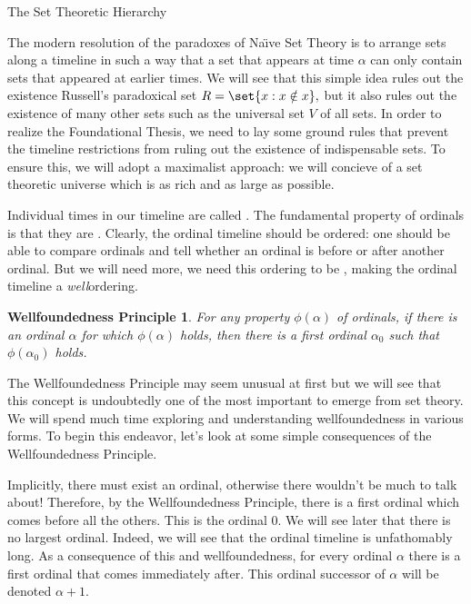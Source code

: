 \begin{unit}{The Set Theoretic Hierarchy}
\theoremstyle{themph}
\newtheorem*{boundedcomprehension}{Bounded Comprehension Principle}
\newtheorem*{hierarchyprinciple}{Hierarchy Principle}
\newtheorem*{inaccessibility}{Inaccessibility Principle}
\newtheorem*{unboundedness}{Unboundedness Principle}
\newtheorem*{wellfoundedness}{Wellfoundedness Principle}
\newtheorem*{infinity}{Infinity Principle}

The modern resolution of the paradoxes of Na{\"\i}ve Set Theory is to arrange sets along a timeline in such a way that a set that appears at time \(\alpha\) can only contain sets that appeared at earlier times.
We will see that this simple idea rules out the existence Russell's paradoxical set \(R = \set{x : x \notin x},\) but it also rules out the existence of many other sets such as the universal set \(V\) of all sets.
In order to realize the Foundational Thesis, we need to lay some ground rules that prevent the timeline restrictions from ruling out the existence of indispensable sets.
To ensure this, we will adopt a maximalist approach: we will concieve of a set theoretic universe which is as rich and as large as possible.

Individual times in our timeline are called .
The fundamental property of ordinals is that they are .
Clearly, the ordinal timeline should be ordered: one should be able to compare ordinals and tell whether an ordinal is before or after another ordinal.
But we will need more, we need this ordering to be , making the ordinal timeline a \emph{well}ordering.

\begin{wellfoundedness}\label{A:Wellfoundedness}
  For any property \(\phi(\alpha)\) of ordinals, if there is an ordinal \(\alpha\) for which \(\phi(\alpha)\) holds, then there is a \textit{first} ordinal \(\alpha_0\) such that \(\phi(\alpha_0)\) holds.
\end{wellfoundedness}

\noindent
The Wellfoundedness Principle may seem unusual at first but we will see that this concept is undoubtedly one of the most important to emerge from set theory.
We will spend much time exploring and understanding wellfoundedness in various forms.
To begin this endeavor, let's look at some simple consequences of the Wellfoundedness Principle.

Implicitly, there must exist an ordinal, otherwise there wouldn't be much to talk about! 
Therefore, by the Wellfoundedness Principle, there is a first ordinal which comes before all the others. 
This is the ordinal \(0.\)
We will see later that there is no largest ordinal.
Indeed, we will see that the ordinal timeline is unfathomably long.
As a consequence of this and wellfoundedness, for every ordinal \(\alpha\) there is a first ordinal that comes immediately after.
This ordinal successor of \(\alpha\) will be denoted \(\alpha+1.\)


\end{unit}
